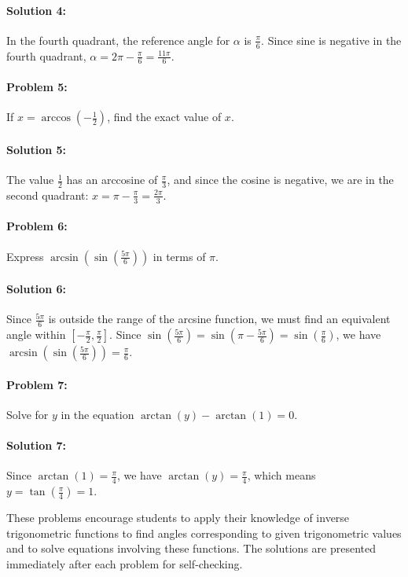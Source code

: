 \documentclass[a4paper,12pt]{book}
\newcounter{problem}
\begin{document}
\paragraph{Solution 4:}
In the fourth quadrant, the reference angle for $\alpha$ is $\frac{\pi}{6}$. Since sine is negative in the fourth quadrant, $\alpha = 2\pi - \frac{\pi}{6} = \frac{11\pi}{6}$.

\paragraph{Problem 5:} If $x = \arccos(-\frac{1}{2})$, find the exact value of $x$.

\paragraph{Solution 5:}
The value $\frac{1}{2}$ has an arccosine of $\frac{\pi}{3}$, and since the cosine is negative, we are in the second quadrant: $x = \pi - \frac{\pi}{3} = \frac{2\pi}{3}$.

\paragraph{Problem 6:} Express $\arcsin\left(\sin\left(\frac{5\pi}{6}\right)\right)$ in terms of $\pi$.

\paragraph{Solution 6:}
Since $\frac{5\pi}{6}$ is outside the range of the arcsine function, we must find an equivalent angle within $[-\frac{\pi}{2}, \frac{\pi}{2}]$. Since $\sin\left(\frac{5\pi}{6}\right) = \sin\left(\pi - \frac{5\pi}{6}\right) = \sin\left(\frac{\pi}{6}\right)$, we have $\arcsin\left(\sin\left(\frac{5\pi}{6}\right)\right) = \frac{\pi}{6}$.

\paragraph{Problem 7:} Solve for $y$ in the equation $\arctan(y) - \arctan(1) = 0$.

\paragraph{Solution 7:}
Since $\arctan(1) = \frac{\pi}{4}$, we have $\arctan(y) = \frac{\pi}{4}$, which means $y = \tan\left(\frac{\pi}{4}\right) = 1$.

These problems encourage students to apply their knowledge of inverse trigonometric functions to find angles corresponding to given trigonometric values and to solve equations involving these functions. The solutions are presented immediately after each problem for self-checking.
\end{document}
